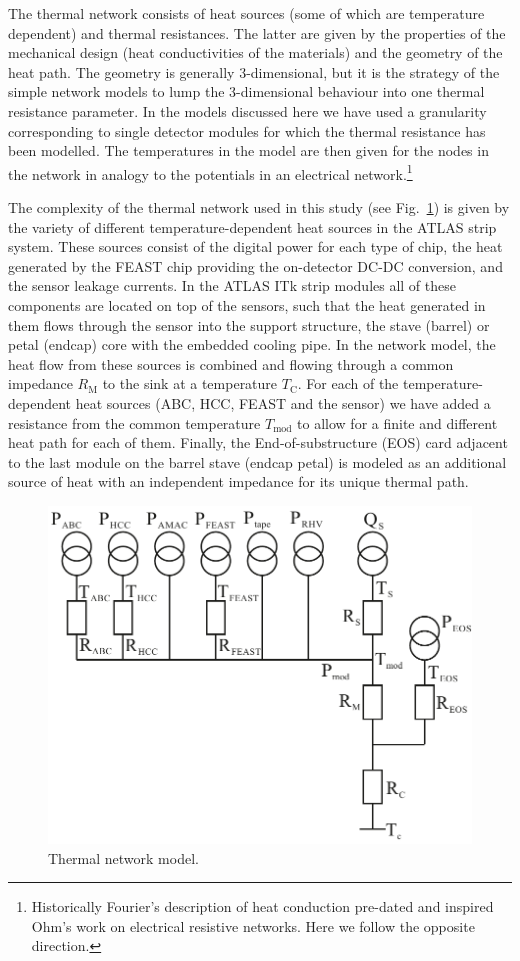 The thermal network consists of heat sources (some of which are temperature dependent) and thermal resistances. The latter are given by the properties of the mechanical design (heat conductivities of the materials) and the geometry of the heat path. The geometry is generally 3-dimensional, but it is the strategy of the simple network models to lump the 3-dimensional behaviour into one thermal resistance parameter. In the models discussed here we have used a granularity corresponding to single detector modules for which the thermal resistance has been modelled. The temperatures in the model are then given for the nodes in the network in analogy to the potentials in an electrical network.\footnote{Historically Fourier's description of heat conduction pre-dated and inspired Ohm's work on electrical resistive networks. Here we follow the opposite direction.} 

The complexity of the thermal network used in this study (see Fig.~\ref{fig:thermalmodel}) is given by the variety of different temperature-dependent heat sources in the ATLAS strip system. These sources consist of the digital power for each type of chip, the heat generated by the FEAST chip providing the on-detector DC-DC conversion, and the sensor leakage currents. In the ATLAS ITk strip modules all of these components are located on top of the sensors, such that the heat generated in them flows through the sensor into the support structure, the stave (barrel) or petal (endcap) core with the embedded cooling pipe. In the network model, the heat flow from these sources is combined and flowing through a common impedance $R_\text{M}$ to the sink at a temperature $T_\text{C}$. For each of the temperature-dependent heat sources (ABC, HCC, FEAST and the sensor) we have added a resistance from the common temperature $T_\text{mod}$ to allow for a finite and different heat path for each of them. Finally, the End-of-substructure (EOS) card adjacent to the last module on the barrel stave (endcap petal) is modeled as an additional source of heat with an independent impedance for its unique thermal path. 

\begin{figure}[ht]
\centering
\includegraphics[width=0.6\linewidth]{figures/Thermalmodel.pdf}
\caption{Thermal network model.}
\label{fig:thermalmodel}
\end{figure}

